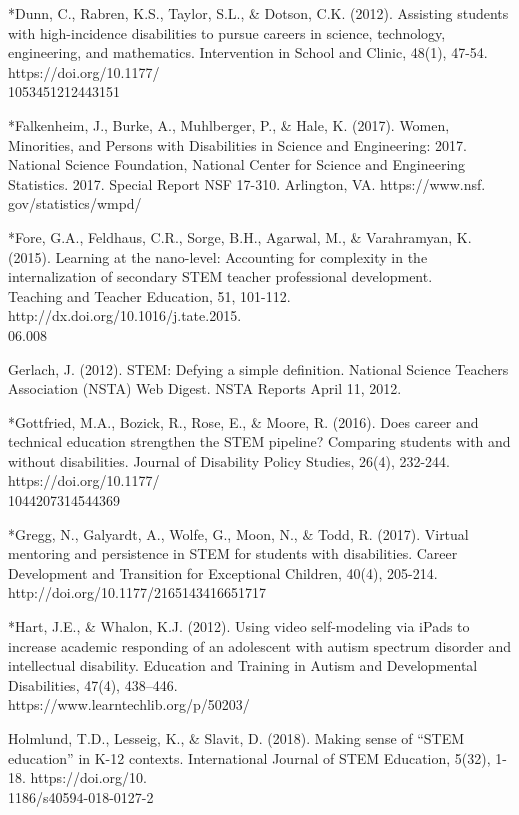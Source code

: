 \documentclass[11pt]{sig-alternate}
\begin{document}
\begin{large}
*Dunn, C., Rabren, K.S., Taylor, S.L., \& Dotson, C.K. (2012). Assisting students with high-incidence disabilities to pursue careers in science, technology, engineering, and mathematics. Intervention in School and Clinic, 48(1), 47-54. https://doi.org/10.1177/\\1053451212443151

*Falkenheim, J., Burke, A., Muhlberger, P., \& Hale, K. (2017). Women, Minorities, and Persons with Disabilities in Science and Engineering: 2017. National Science Foundation, National Center for Science and Engineering Statistics. 2017. Special Report NSF 17-310. Arlington, VA. https://www.nsf.\\gov/statistics/wmpd/

*Fore, G.A., Feldhaus, C.R., Sorge, B.H., Agarwal, M., \& Varahramyan, K. (2015). Learning at the nano-level: Accounting for complexity in the internalization of secondary STEM teacher professional development. \\Teaching and Teacher Education, 51, 101-112. http://dx.doi.org/10.1016/j.tate.2015.\\06.008

Gerlach, J. (2012). STEM: Defying a simple definition. National Science Teachers Association (NSTA) Web Digest. NSTA Reports April 11, 2012. 

*Gottfried, M.A., Bozick, R., Rose, E., \& Moore, R. (2016). Does career and technical education strengthen the STEM pipeline? Comparing students with and without disabilities. Journal of Disability Policy Studies, 26(4), 232-244. https://doi.org/10.1177/\\1044207314544369

*Gregg, N., Galyardt, A., Wolfe, G., Moon, N., \& Todd, R. (2017). Virtual mentoring and 
persistence in STEM for students with disabilities. Career Development and Transition for Exceptional Children, 40(4), 205-214. http://doi.org/10.1177/2165143416651717

*Hart, J.E., \& Whalon, K.J. (2012). Using video self-modeling via iPads to increase academic 
responding of an adolescent with autism spectrum disorder and intellectual disability. 
Education and Training in Autism and Developmental Disabilities, 47(4), 438–446. \\https://www.learntechlib.org/p/50203/

Holmlund, T.D., Lesseig, K., \& Slavit, D. (2018). Making sense of “STEM education” in K-12 contexts. International Journal of STEM Education, 5(32), 1-18. https://doi.org/10.\\1186/s40594-018-0127-2


\end{large}
\end{document}
